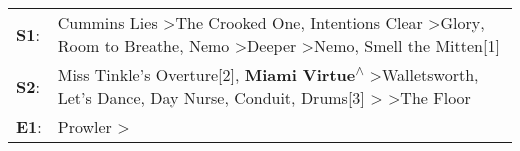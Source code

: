 \begin{supertabular}{p{0.03\textwidth}p{0.92\textwidth}}
 \textbf{S1}:  &        Cummins Lies\textsuperscript{} \textgreater \enspace The Crooked One\textsuperscript{}, \enspace Intentions Clear\textsuperscript{} \textgreater \enspace Glory\textsuperscript{}, \enspace Room to Breathe\textsuperscript{}, \enspace Nemo\textsuperscript{} \textgreater \enspace Deeper\textsuperscript{} \textgreater \enspace Nemo\textsuperscript{}, \enspace Smell the Mitten[1]\textsuperscript{}  \enspace  \\
 \textbf{S2}:  &  Miss Tinkle's Overture[2]\textsuperscript{}, \enspace \textbf{Miami Virtue\textsuperscript{$\wedge$}} \textgreater \enspace Walletsworth\textsuperscript{}, \enspace Let's Dance\textsuperscript{}, \enspace Day Nurse\textsuperscript{}, \enspace Conduit\textsuperscript{}, \enspace Drums[3]\textsuperscript{} \textgreater {}\textsuperscript{} \textgreater \enspace The Floor\textsuperscript{}  \enspace  \\
 \textbf{E1}:  &                                                                                                                                                                                                                                                                                                                                            Prowler\textsuperscript{} \textgreater {}\textsuperscript{}  \enspace  \\
\end{supertabular}
